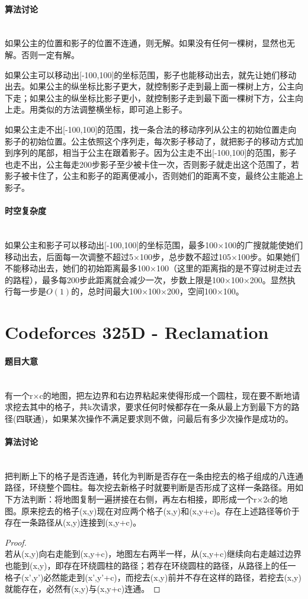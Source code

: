 \documentclass[UTF8]{ctexart}
\newcommand{\myparagraph}[1]{\paragraph{#1}\mbox{}\\}
\theoremstyle{nonumberplain}
\newtheorem{proof}{\hspace{1em}证明：}
\begin{document}
		\myparagraph{算法讨论}
			
			如果公主的位置和影子的位置不连通，则无解。如果没有任何一棵树，显然也无解。否则一定有解。
			
			如果公主可以移动出[-100,100]的坐标范围，影子也能移动出去，就先让她们移动出去。如果公主的纵坐标比影子更大，就控制影子走到最上面一棵树上方，公主向下走；如果公主的纵坐标比影子更小，就控制影子走到最下面一棵树下方，公主向上走。用类似的方法调整横坐标，即可追上影子。
			
			如果公主走不出[-100,100]的范围，找一条合法的移动序列从公主的初始位置走向影子的初始位置。公主依照这个序列走，每次影子移动了，就把影子的移动方式加到序列的尾部，相当于公主在跟着影子。因为公主走不出[-100,100]的范围，影子也走不出，公主每走200步影子至少被卡住一次，否则影子就走出这个范围了，若影子被卡住了，公主和影子的距离便减小，否则她们的距离不变，最终公主能追上影子。
			
		\myparagraph{时空复杂度}
			
			如果公主和影子可以移动出[-100,100]的坐标范围，最多100×100的广搜就能使她们移动出去，后面每一次调整不超过5×100步，总步数不超过105×100步。如果她们不能移动出去，她们的初始距离最多100×100（这里的距离指的是不穿过树走过去的路程），最多每200步此距离就会减少一次，步数上限是100×100×200。显然执行每一步是$O(1)$的，总时间最大100×100×200，空间100×100。
	
	\section{Codeforces 325D - Reclamation}
		
		\myparagraph{题目大意}
		
			有一个r×c的地图，把左边界和右边界粘起来使得形成一个圆柱，现在要不断地请求挖去其中的格子，共k次请求，要求任何时候都存在一条从最上方到最下方的路径(四联通)，如果某次操作不满足要求则不做，问最后有多少次操作是成功的。
		
		\myparagraph{算法讨论}
		
			把判断上下的格子是否连通，转化为判断是否存在一条由挖去的格子组成的八连通路径，环绕整个圆柱。每次挖去新格子时就要判断是否形成了这样一条路径。用如下方法判断：将地图复制一遍拼接在右侧，再左右相接，即形成一个r×2c的地图。原来挖去的格子(x,y)现在对应两个格子(x,y)和(x,y+c)。存在上述路径等价于存在一条路径从(x,y)连接到(x,y+c)。
			
			\begin{proof}\mbox{}\\
			
				若从(x,y)向右走能到(x,y+c)，地图左右两半一样，从(x,y+c)继续向右走越过边界也能到(x,y)，即存在环绕圆柱的路径；若存在环绕圆柱的路径，从路径上的任一格子(x',y')必然能走到(x',y'+c)，而挖去(x,y)前并不存在这样的路径，若挖去(x,y)就能存在，必然有(x,y)与(x,y+c)连通。
			
			\end{proof}
		
\end{document}
